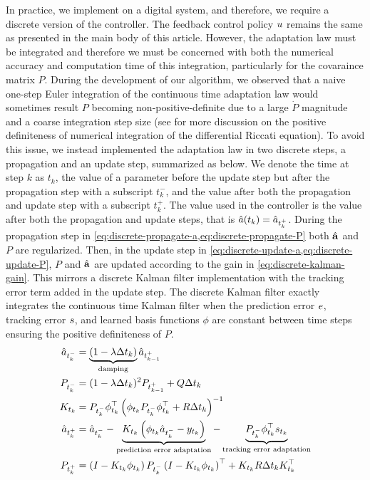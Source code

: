 In practice, we implement \nf on a digital system, and therefore, we require a discrete version of the controller. The feedback control policy $ u$ remains the same as presented in the main body of this article. However, the adaptation law must be integrated and therefore we must be concerned with both the numerical accuracy and computation time of this integration, particularly for the covaraince matrix $P$. During the development of our algorithm, we observed that a naive one-step Euler integration of the continuous time adaptation law would sometimes result $P$ becoming non-positive-definite due to a large $\dot{P}$ magnitude and a coarse integration step size (see \cite{dieci_positive_1994} for more discussion on the positive definiteness of numerical integration of the differential Riccati equation). To avoid this issue, we instead implemented the adaptation law in two discrete steps, a propagation and an update step, summarized as below. We denote the time at step $k$ as $t_k$, the value of a parameter before the update step but after the propagation step with a subscript $t_k^-$, and the value after both the propagation and update step with a subscript $t_k^+$. The value used in the controller is the value after both the propagation and update steps, that is $\hat{ a}(t_k) = \hat{ a}_{t_k^+}$. During the propagation step in \cref{eq:discrete-propagate-a,eq:discrete-propagate-P} both $\hat{\mathbf{a}}$ and $P$ are regularized. Then, in the update step in \cref{eq:discrete-update-a,eq:discrete-update-P}, $P$ and $\hat{\mathbf{a}}$ are updated according to the gain in \cref{eq:discrete-kalman-gain}. This mirrors a discrete Kalman filter implementation \cite{kalman_new_1960} with the tracking error term added in the update step. The discrete Kalman filter exactly integrates the continuous time Kalman filter when the prediction error $ e$, tracking error $ s$, and learned basis functions $\phi$ are constant between time steps ensuring the positive definiteness of $P$. 
\begin{align}
    \label{eq:discrete-propagate-a}
    \hat{ a}_{t_k^-} &= \underbrace{(1 - \lambda \Delta t_k)}_{\text{damping}} \hat{ a}_{t_{k-1}^+}
    \\
    \label{eq:discrete-propagate-P}
    P_{t_k^-} &= (1 -  \lambda \Delta t_k)^2 P_{t_{k-1}^+} + Q \Delta t_k 
    \\
    \label{eq:discrete-kalman-gain}
    K_{t_k} &= P_{t_k^-}  \phi_{t_k}^\top \left(\phi_{t_k} P_{t_k^-} \phi_{t_k}^\top + R \Delta t_k\right)^{-1} 
    \\
    \label{eq:discrete-update-a}
    \hat{ a}_{t_k^+} &= \hat{ a}_{t_k^-} - \underbrace{K_{t_k}\left( \phi_{t_k}\hat{ a}_{t_k^-} -  y_{t_k}\right)}_{\text{prediction error adaptation}} - \underbrace{P_{t_k^-} \phi_{t_k}^\top  s_{t_k}}_{\text{tracking error adaptation}} 
    \\
    \label{eq:discrete-update-P}
    P_{t_k^+} &= \left(I - K_{t_k} \phi_{t_k}\right) P_{t_k^-} \left(I - K_{t_k} \phi_{t_k}\right)^\top + K_{t_k} R \Delta t_k K_{t_k}^\top 
\end{align}


